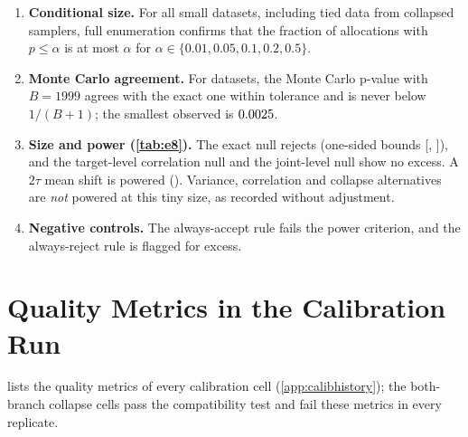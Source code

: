 \documentclass{article}
\theoremstyle{plain}
\theoremstyle{definition}
\theoremstyle{remark}
\begin{document}
\begin{enumerate}
\item \textbf{Conditional size.} For all \numEeightAdatasets{} small datasets, including tied data from collapsed samplers, full enumeration confirms that the fraction of allocations with $p\le\alpha$ is at most $\alpha$ for $\alpha\in\{0.01,0.05,0.1,0.2,0.5\}$.
\item \textbf{Monte Carlo agreement.} For \numEeightBdatasets{} datasets, the Monte Carlo p-value with $B=1999$ agrees with the exact one within tolerance and is never below $1/(B+1)$; the smallest observed is $0.0025$.
\item \textbf{Size and power (\cref{tab:e8}).} The exact null rejects \numEeightNullK{} (one-sided bounds [\numEeightNullLo, \numEeightNullHi]), and the target-level correlation null and the joint-level null show no excess. A $2\tau$ mean shift is powered (\numEeightShiftK). Variance, correlation and collapse alternatives are \emph{not} powered at this tiny size, as recorded without adjustment.
\item \textbf{Negative controls.} The always-accept rule fails the power criterion, and the always-reject rule is flagged for excess.
\end{enumerate}

\section{Quality Metrics in the Calibration Run}
\label{app:calibq}
 lists the quality metrics of every calibration cell (\cref{app:calibhistory}); the both-branch collapse cells pass the compatibility test and fail these metrics in every replicate.
\begin{table}[h]
\centering
\caption{Quality metrics in the calibration run: mean CRPS excess over the true conditional ($\times10^3$) for each branch, oracle sd ratio of the sequential branch, and the share of replicates whose 95\% CI for the sequential CRPS excess lies above $0$.}
\label{tab:calibq}
\scriptsize
\setlength{\tabcolsep}{3pt}

\end{table}
\end{document}
